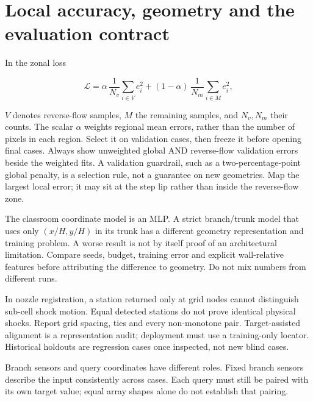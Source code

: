 \section*{Local accuracy, geometry and the evaluation contract}
In the zonal loss

\[\mathcal L=\alpha\,\frac{1}{N_v}\sum_{i\in V}e_i^2
+(1-\alpha)\,\frac{1}{N_m}\sum_{i\in M}e_i^2,\]

$V$ denotes reverse-flow samples, $M$ the remaining samples, and $N_v,N_m$
their counts. The scalar $\alpha$ weights regional mean errors, rather than
the number of pixels in each region. Select it on validation cases, then freeze
it before opening final cases. Always show unweighted global AND reverse-flow
validation errors beside the weighted fits. A validation guardrail, such as a
two-percentage-point global penalty, is a selection rule, not a guarantee on new
geometries. Map the largest local error; it may sit at the step lip rather than
inside the reverse-flow zone.

The classroom coordinate model is an MLP. A strict branch/trunk model that uses
only $(x/H,y/H)$ in its trunk has a different geometry representation and training
problem. A worse result is not by itself proof of an architectural limitation.
Compare seeds, budget, training error and explicit wall-relative features before
attributing the difference to geometry. Do not mix numbers from different runs.

In nozzle registration, a station returned only at grid nodes cannot distinguish
sub-cell shock motion. Equal detected stations do not prove identical physical
shocks. Report grid spacing, ties and every non-monotone pair. Target-assisted
alignment is a representation audit; deployment must use a training-only locator.
Historical holdouts are regression cases once inspected, not new blind cases.

Branch sensors and query coordinates have different roles. Fixed branch sensors
describe the input consistently across cases. Each query must still be paired
with its own target value; equal array shapes alone do not establish that pairing.
